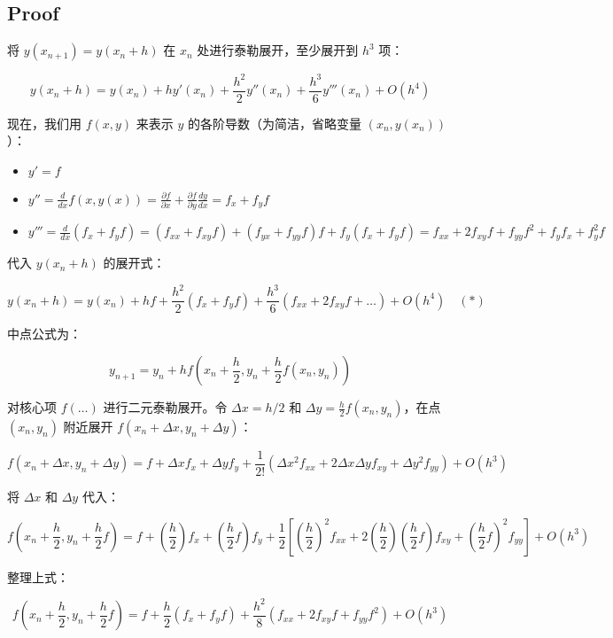 \documentclass[11pt]{article}
\providecommand{\tightlist}{%
      \setlength{\itemsep}{0pt}\setlength{\parskip}{0pt}}
\begin{document}
\subsection{Proof}\label{proof}

将 \(y(x_{n+1}) = y(x_n + h)\) 在 \(x_n\) 处进行泰勒展开，至少展开到
\(h^3\) 项：

\[ y(x_n + h) = y(x_n) + h y'(x_n) + \frac{h^2}{2} y''(x_n) + \frac{h^3}{6} y'''(x_n) + O(h^4) \]

现在，我们用 \(f(x, y)\) 来表示 \(y\) 的各阶导数（为简洁，省略变量
\((x_n, y(x_n))\)）：

\begin{itemize}
\tightlist
\item
  \(y' = f\)
\item
  \(y'' = \frac{d}{dx}f(x, y(x)) = \frac{\partial f}{\partial x} + \frac{\partial f}{\partial y} \frac{dy}{dx} = f_x + f_y f\)
\item
  \(y''' = \frac{d}{dx}(f_x + f_y f) = (f_{xx} + f_{xy}f) + (f_{yx} + f_{yy}f)f + f_y(f_x + f_y f) = f_{xx} + 2f_{xy}f + f_{yy}f^2 + f_y f_x + f_y^2 f\)
\end{itemize}

代入 \(y(x_n+h)\) 的展开式：

\[ y(x_n + h) = y(x_n) + hf + \frac{h^2}{2}(f_x + f_y f) + \frac{h^3}{6}(f_{xx} + 2f_{xy}f + \dots) + O(h^4) \quad (*)\]

中点公式为：

\[ y_{n+1} = y_n + h f\left(x_n + \frac{h}{2}, y_n + \frac{h}{2}f(x_n, y_n)\right) \]

对核心项 \(f(\dots)\) 进行二元泰勒展开。令 \(\Delta x = h/2\) 和
\(\Delta y = \frac{h}{2}f(x_n, y_n)\)，在点 \((x_n, y_n)\) 附近展开
\(f(x_n + \Delta x, y_n + \Delta y)\)：

\[ f(x_n + \Delta x, y_n + \Delta y) = f + \Delta x f_x + \Delta y f_y + \frac{1}{2!}(\Delta x^2 f_{xx} + 2\Delta x \Delta y f_{xy} + \Delta y^2 f_{yy}) + O(h^3) \]

将 \(\Delta x\) 和 \(\Delta y\) 代入：

\[ f\left(x_n + \frac{h}{2}, y_n + \frac{h}{2}f\right) = f + \left(\frac{h}{2}\right)f_x + \left(\frac{h}{2}f\right)f_y + \frac{1}{2}\left[\left(\frac{h}{2}\right)^2 f_{xx} + 2\left(\frac{h}{2}\right)\left(\frac{h}{2}f\right)f_{xy} + \left(\frac{h}{2}f\right)^2 f_{yy}\right] + O(h^3) \]

整理上式：

\[ f\left(x_n + \frac{h}{2}, y_n + \frac{h}{2}f\right) = f + \frac{h}{2}(f_x + f_y f) + \frac{h^2}{8}(f_{xx} + 2f_{xy}f + f_{yy}f^2) + O(h^3) \]
\end{document}
